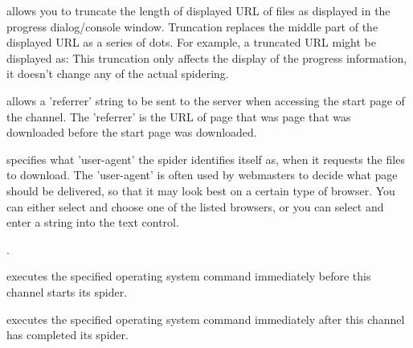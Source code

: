 allows you to truncate the length of displayed URL of files as
displayed in the progress dialog/console window. Truncation replaces the
middle part of the displayed URL as a series of dots. For example, a
truncated URL might be displayed as:
This truncation only affects the display of the progress information,
it doesn't change any of the actual spidering.

 allows a 'referrer' string to be sent
to the server when accessing the start page of the channel. The 'referrer' is
the URL of page that was page that was downloaded before the start page was
downloaded.

 specifies what 'user-agent' the spider identifies itself as,
when it requests the files to download. The 'user-agent' is often used by
webmasters to decide what page should be delivered, so that it may look best
on a certain type of browser. You can either select
 and choose one of the listed browsers, or
you can select 
and enter a string into the text control.

.

 executes the 
specified operating system command immediately before this channel starts its 
spider.

 executes the 
specified operating system command immediately after this channel has 
completed its spider.



